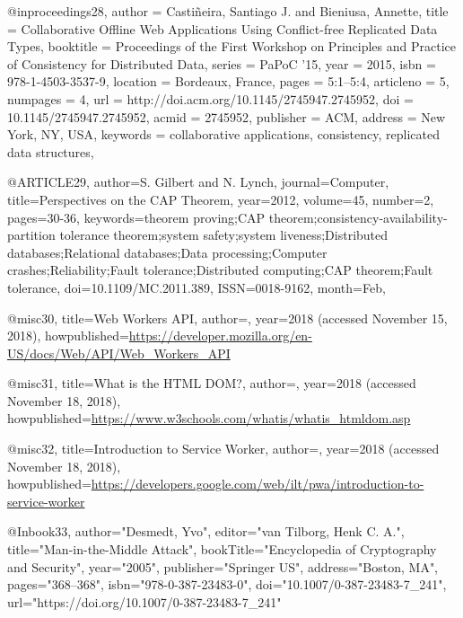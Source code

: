 @inproceedings{28,
 author = {Casti\~{n}eira, Santiago J. and Bieniusa, Annette},
 title = {Collaborative Offline Web Applications Using Conflict-free Replicated Data Types},
 booktitle = {Proceedings of the First Workshop on Principles and Practice of Consistency for Distributed Data},
 series = {PaPoC '15},
 year = {2015},
 isbn = {978-1-4503-3537-9},
 location = {Bordeaux, France},
 pages = {5:1--5:4},
 articleno = {5},
 numpages = {4},
 url = {http://doi.acm.org/10.1145/2745947.2745952},
 doi = {10.1145/2745947.2745952},
 acmid = {2745952},
 publisher = {ACM},
 address = {New York, NY, USA},
 keywords = {collaborative applications, consistency, replicated data structures},
}

@ARTICLE{29, 
author={S. Gilbert and N. Lynch}, 
journal={Computer}, 
title={Perspectives on the CAP Theorem}, 
year={2012}, 
volume={45}, 
number={2}, 
pages={30-36}, 
keywords={theorem proving;CAP theorem;consistency-availability-partition tolerance theorem;system safety;system liveness;Distributed databases;Relational databases;Data processing;Computer crashes;Reliability;Fault tolerance;Distributed computing;CAP theorem;Fault tolerance}, 
doi={10.1109/MC.2011.389}, 
ISSN={0018-9162}, 
month={Feb},}

@misc{30,
title={Web Workers API},
author={},
year={2018 (accessed November 15, 2018)},
howpublished={\url{https://developer.mozilla.org/en-US/docs/Web/API/Web_Workers_API}}
}

@misc{31,
title={What is the HTML DOM?},
author={},
year={2018 (accessed November 18, 2018)},
howpublished={\url{https://www.w3schools.com/whatis/whatis_htmldom.asp}}
}

@misc{32,
title={Introduction to Service Worker},
author={},
year={2018 (accessed November 18, 2018)},
howpublished={\url{https://developers.google.com/web/ilt/pwa/introduction-to-service-worker}}
}

@Inbook{33,
author="Desmedt, Yvo",
editor="van Tilborg, Henk C. A.",
title="Man-in-the-Middle Attack",
bookTitle="Encyclopedia of Cryptography and Security",
year="2005",
publisher="Springer US",
address="Boston, MA",
pages="368--368",
isbn="978-0-387-23483-0",
doi="10.1007/0-387-23483-7_241",
url="https://doi.org/10.1007/0-387-23483-7_241"
}
